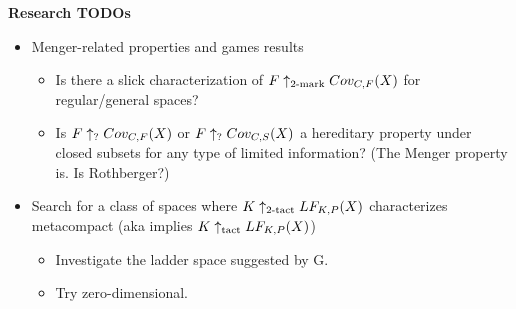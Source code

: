 


\centerline{\bf Research TODOs}

  \begin{itemize}
    \item Menger-related properties and games results
      \begin{itemize}
        \item Is there a slick characterization of $F\uparrow_{2\text{-mark}}Cov_{C,F}(X)$ for regular/general spaces?
        \item Is $F\uparrow_{?}Cov_{C,F}(X)$ or $F\uparrow_{?}Cov_{C,S}(X)$ a hereditary property under closed subsets for any type of limited information? (The Menger property is. Is Rothberger?)
      \end{itemize}
    \item Search for a class of spaces where $K\uparrow_{2\text{-tact}}LF_{K,P}(X)$ characterizes metacompact (aka implies $K\uparrow_{\text{tact}}LF_{K,P}(X)$)
      \begin{itemize}
        \item Investigate the ladder space suggested by G.
        \item Try zero-dimensional.
      \end{itemize}
  \end{itemize}
